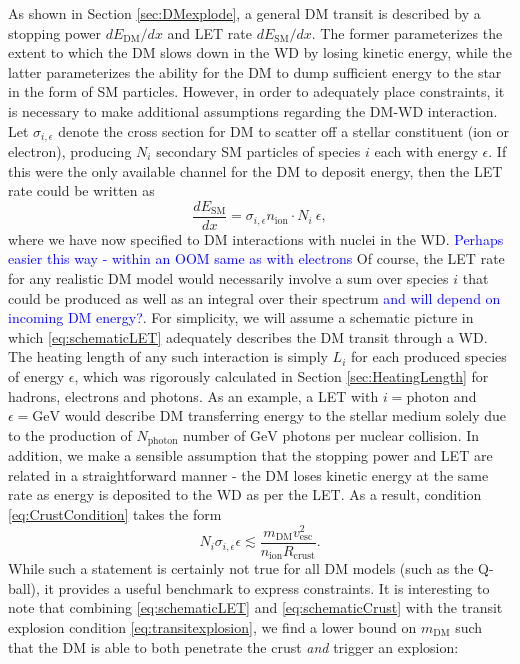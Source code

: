 \documentclass[twocolumn,showpacs,preprintnumbers,amsmath,amssymb,prd]{revtex4}
\newcommand{\GeV}{\text{GeV}}
\begin{document}
As shown in Section \ref{sec:DMexplode}, a general DM transit is described by a stopping power $d E_\text{DM}/dx$ and LET rate $dE_\text{SM} /dx$. The former parameterizes the extent to which the DM slows down in the WD by losing kinetic energy, while the latter parameterizes the ability for the DM to dump sufficient energy to the star in the form of SM particles. However, in order to adequately place constraints, it is necessary to make additional assumptions regarding the DM-WD interaction. Let $\sigma_{i,\epsilon}$ denote the cross section for DM to scatter off a stellar constituent (ion or electron), producing $N_i$ secondary SM particles of species $i$ each with energy $\epsilon$. If this were the only available channel for the DM to deposit energy, then the LET rate could be written as
\begin{equation}
\label{eq:schematicLET}
\frac{d E_\text{SM}}{d x} = \sigma_{i,\epsilon} n_\text{ion} \cdot N_i ~\epsilon,
\end{equation}
where we have now specified to DM interactions with nuclei in the WD. \textcolor{blue}{Perhaps easier this way - within an OOM same as with electrons} Of course, the LET rate for any realistic DM model would necessarily involve a sum over species $i$ that could be produced as well as an integral over their spectrum \textcolor{blue}{and will depend on incoming DM energy?}. For simplicity, we will assume a schematic picture in which \eqref{eq:schematicLET} adequately describes the DM transit through a WD. The heating length of any such interaction is simply $L_i$ for each produced species of energy $\epsilon$, which was rigorously calculated in Section \ref{sec:HeatingLength} for hadrons, electrons and photons. As an example, a LET with $i = \text{photon}$ and $\epsilon = \GeV$ would describe DM transferring energy to the stellar medium solely due to the production of $N_\text{photon}$ number of $\GeV$ photons per nuclear collision. In addition, we make a sensible assumption that the stopping power and LET are related in a straightforward manner - the DM loses kinetic energy at the same rate as energy is deposited to the WD as per the LET. As a result, condition \eqref{eq:CrustCondition} takes the form
\begin{equation}
\label{eq:schematicCrust}
N_i \sigma_{i,\epsilon} \epsilon \lesssim \frac{m_\text{DM}v_\text{esc}^2}{n_\text{ion} R_\text{crust}}.
\end{equation}
While such a statement is certainly not true for all DM models (such as the Q-ball), it provides a useful benchmark to express constraints. It is interesting to note that combining \eqref{eq:schematicLET} and \eqref{eq:schematicCrust} with the transit explosion condition \eqref{eq:transitexplosion}, we find a lower bound on $m_{\text{DM}}$ such that the DM is able to both penetrate the crust \emph{and} trigger an explosion:
\end{document}
